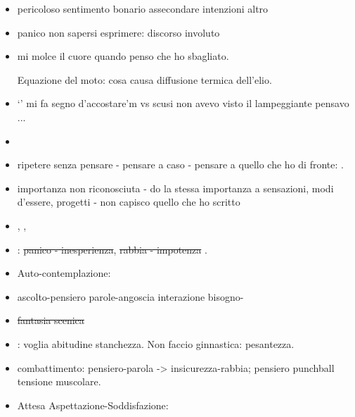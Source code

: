 \begin{itemize}

\item pericoloso sentimento bonario assecondare intenzioni altro

\item panico non sapersi esprimere: discorso involuto

\item mi molce il cuore quando penso che ho sbagliato.

Equazione del moto: cosa causa diffusione termica dell’elio.

\item ‘’ mi fa segno d’accostare’m vs scusi non avevo visto il lampeggiante pensavo ...

\item {} 

\item ripetere senza pensare - pensare a caso - pensare a quello che ho di fronte: .

\item importanza non riconosciuta - do la stessa importanza a sensazioni, modi d’essere, progetti - non capisco quello che ho scritto 

\item {}, , 

\item {}: \sout{panico - inesperienza}, \sout{rabbia - impotenza} .

\item Auto-contemplazione: 

\item ascolto-pensiero parole-angoscia interazione bisogno-

\item \sout{fantasia scenica} 

\item {}: voglia abitudine stanchezza. Non faccio ginnastica: pesantezza.

\item combattimento: pensiero-parola -> insicurezza-rabbia; pensiero punchball tensione muscolare.

\item Attesa Aspettazione-Soddisfazione: 


\end{itemize}
